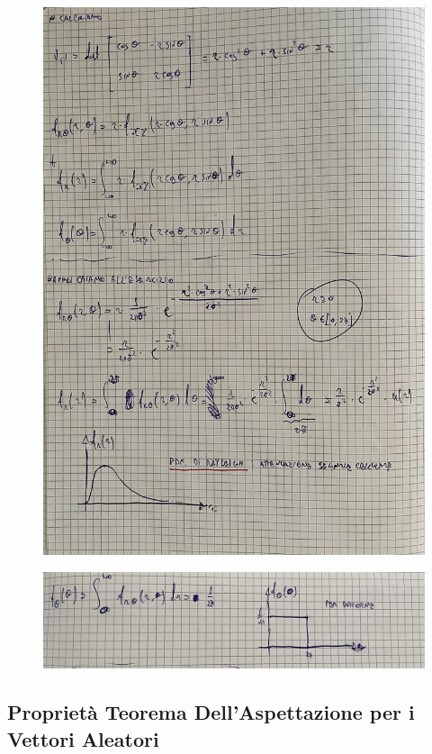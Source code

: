 \documentclass{article}
\begin{document}
\begin{figure}[H]
\centering
\includegraphics[scale=0.16]{images/82a.jpeg}
\end{figure} 
\begin{figure}[H]
\centering
\includegraphics[scale=0.14]{images/82b.jpeg}
\end{figure} 

\subsection{Proprietà Teorema Dell’Aspettazione per i Vettori Aleatori}
\end{document}
